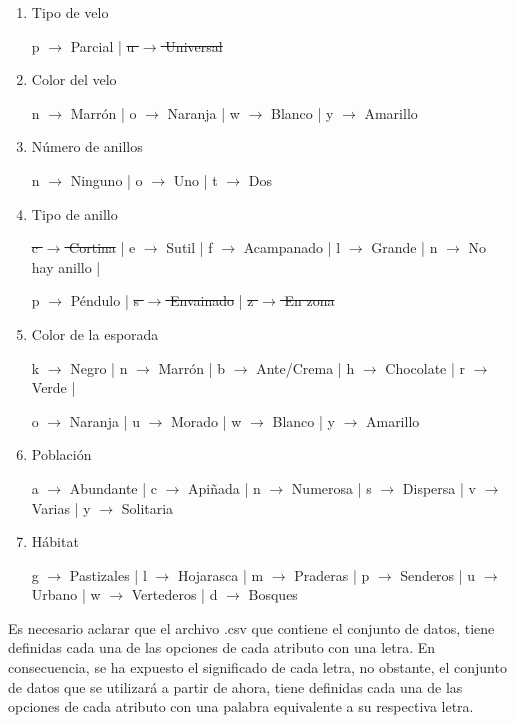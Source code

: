 \documentclass{Plantilla/Formato_EPEF}
\begin{document}
\begin{enumerate}
	\item Tipo de velo
	
	p $\rightarrow$ Parcial | \sout{u $\rightarrow$ Universal}
	
	\item Color del velo
	
	n $\rightarrow$ Marrón | o $\rightarrow$ Naranja | w $\rightarrow$ Blanco | y $\rightarrow$ Amarillo
	
	\item Número de anillos
	
	n $\rightarrow$ Ninguno | o $\rightarrow$ Uno | t $\rightarrow$ Dos
	
	\item Tipo de anillo
	
	\sout{c $\rightarrow$ Cortina} | e $\rightarrow$ Sutil | f $\rightarrow$ Acampanado | l $\rightarrow$ Grande | n $\rightarrow$ No hay anillo | 
	
	p $\rightarrow$ Péndulo | \sout{s $\rightarrow$ Envainado} | \sout{z $\rightarrow$ En zona}
	
	\item Color de la esporada
	
	k $\rightarrow$ Negro | n $\rightarrow$ Marrón | b $\rightarrow$ Ante/Crema | h $\rightarrow$ Chocolate | r $\rightarrow$ Verde |
	
	o $\rightarrow$ Naranja | u $\rightarrow$ Morado | w $\rightarrow$ Blanco | y $\rightarrow$ Amarillo
	
	\item Población
	
	a $\rightarrow$ Abundante | c $\rightarrow$ Apiñada | n $\rightarrow$ Numerosa | s $\rightarrow$ Dispersa | v $\rightarrow$ Varias | y $\rightarrow$ Solitaria
	
	\item Hábitat
	
	g $\rightarrow$ Pastizales | l $\rightarrow$ Hojarasca | m $\rightarrow$ Praderas | p $\rightarrow$ Senderos | u $\rightarrow$ Urbano | w $\rightarrow$ Vertederos | d $\rightarrow$ Bosques
	
\end{enumerate}

Es necesario aclarar que el archivo .csv que contiene el conjunto de datos, tiene definidas cada una de las opciones de cada atributo con una letra. En consecuencia, se ha expuesto el significado de cada letra, no obstante, el conjunto de datos que se utilizará a partir de ahora, tiene definidas cada una de las opciones de cada atributo con una palabra equivalente a su respectiva letra.
\end{document}
